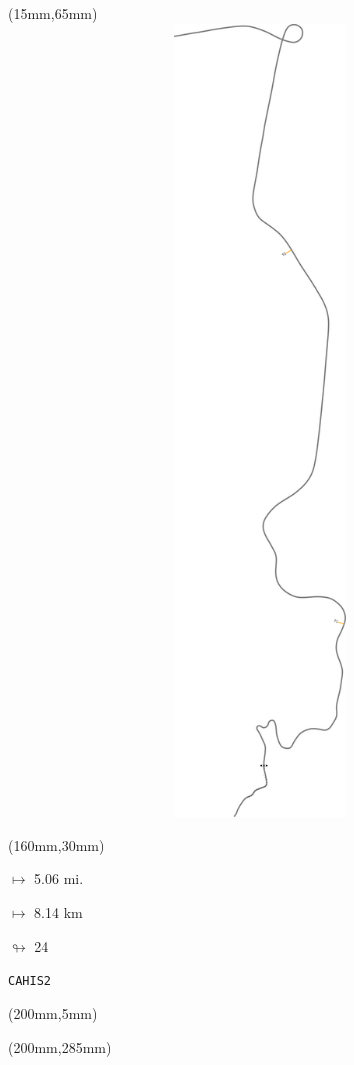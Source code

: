\begin{textblock*}{185mm}(15mm,65mm)%
\centering
\mbox{\includegraphics[width=185mm,height=210mm,keepaspectratio]{PT/CAHIS2.pdf}}
\end{textblock*}
\begin{textblock*}{40mm}(160mm,30mm)%
\Large
\par$\mapsto$ 5.06 mi.
\par$\mapsto$ 8.14 km
\par$\looparrowright$ 24
\par\hfill\tiny\tt CAHIS2\\
\end{textblock*}
\begin{textblock*}{20mm}(200mm,5mm)%
\fbox{\thepage}
\label{CAHIS2}
\end{textblock*}
\begin{textblock*}{20mm}(200mm,285mm)%
\fbox{\thepage}
\end{textblock*}

